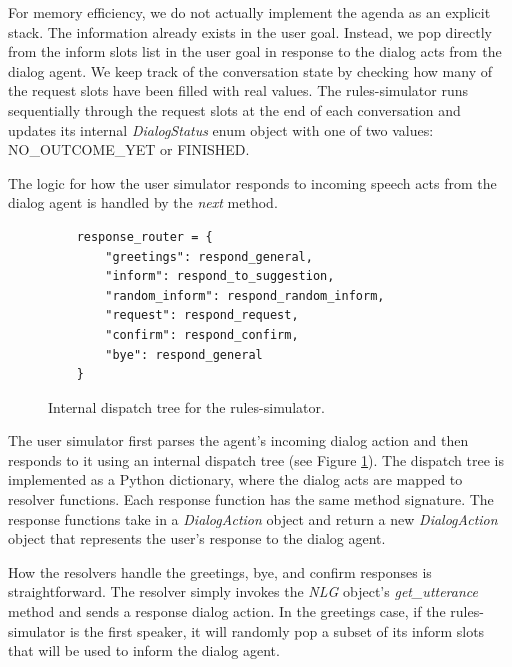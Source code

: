 For memory efficiency, we do not actually implement the agenda as an explicit stack. The information already exists in the user goal. Instead, we pop directly from the inform slots list in the user goal in response to the dialog acts from the dialog agent. We keep track of the conversation state by checking how many of the request slots have been filled with real values. The rules-simulator runs sequentially through the request slots at the end of each conversation and updates its internal\textit{ DialogStatus} enum object with one of two values: NO\_OUTCOME\_YET or FINISHED.

The logic for how the user simulator responds to incoming speech acts from the dialog agent is handled by the \textit{next} method. 

\begin{figure}[h!]
	\label{fig:dispatch_tree}
	\begin{lstlisting}
	response_router = { 
		"greetings": respond_general,
		"inform": respond_to_suggestion,
		"random_inform": respond_random_inform,
		"request": respond_request,
		"confirm": respond_confirm,
		"bye": respond_general
	}	
	\end{lstlisting}
	\caption{ Internal dispatch tree for the rules-simulator. }
\end{figure}

The user simulator first parses the agent's incoming dialog action and then responds to it using an internal dispatch tree (see Figure \ref{fig:dispatch_tree}). The dispatch tree is implemented as a Python dictionary, where the dialog acts are mapped to resolver functions. Each response function has the same method signature.  The response functions take in a \textit{DialogAction} object and return a new \textit{DialogAction} object that represents the user's response to the dialog agent. 
 
How the resolvers handle the greetings, bye, and confirm responses is straightforward. The resolver simply invokes the \textit{NLG} object's \textit{get\_utterance} method and sends a response dialog action. In the greetings case, if the rules-simulator is the first speaker, it will randomly pop a subset of its inform slots that will be used to inform the dialog agent. 

